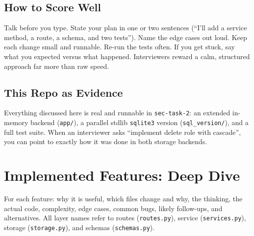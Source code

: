 \documentclass[11pt,a4paper]{report}
\begin{document}
\section{How to Score Well}

Talk before you type. State your plan in one or two sentences (``I'll add a
service method, a route, a schema, and two tests''). Name the edge cases out
loud. Keep each change small and runnable. Re-run the tests often. If you get
stuck, say what you expected versus what happened. Interviewers reward a calm,
structured approach far more than raw speed.

\section{This Repo as Evidence}

Everything discussed here is real and runnable in \texttt{sec-task-2}: an
extended in-memory backend (\texttt{app/}), a parallel stdlib \texttt{sqlite3}
version (\texttt{sql\_version/}), and a full test suite. When an interviewer asks
``implement delete role with cascade'', you can point to exactly how it was done
in both storage backends.

\chapter{Implemented Features: Deep Dive}

For each feature: why it is useful, which files change and why, the thinking, the
actual code, complexity, edge cases, common bugs, likely follow-ups, and
alternatives. All layer names refer to routes (\texttt{routes.py}), service
(\texttt{services.py}), storage (\texttt{storage.py}), and schemas
(\texttt{schemas.py}).
\end{document}
